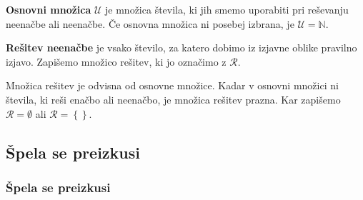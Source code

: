         \begin{frame}

            \begin{alertblock}{}
                \textbf{Osnovni množica} $\mathbf{\mathcal{U}}$ je množica števila, ki jih smemo uporabiti pri reševanju neenačbe ali neenačbe. Če osnovna množica ni posebej izbrana, je $\mathcal{U}=\mathbb{N}$. 
            \end{alertblock}

            \begin{alertblock}{}
                \textbf{Rešitev neenačbe} je vsako število, za katero dobimo iz izjavne oblike pravilno izjavo. Zapišemo množico rešitev, ki jo označimo z $\mathbf{\mathcal{R}}$. 
            \end{alertblock}

            \begin{block}{}
                Množica rešitev je odvisna od osnovne množice.
                Kadar v osnovni množici ni števila, ki reši enačbo ali neenačbo, je množica rešitev prazna. Kar zapišemo $\mathcal{R}=\emptyset$ ali $\mathcal{R}=\left\{\right\}$.
            \end{block}
        \end{frame}

        \subsection{Špela se preizkusi}
        
        \begin{frame}[t]
            \frametitle{Špela se preizkusi}
        \end{frame}